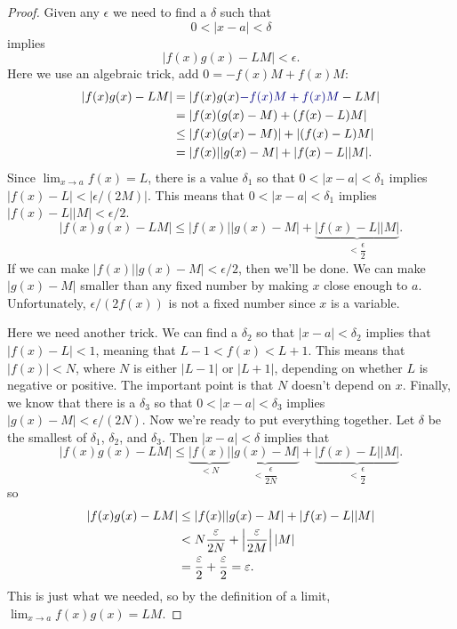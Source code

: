 \begin{proof} 
Given any $\epsilon$ we need to find a $\delta$ such that
\[
0<|x - a|< \delta
\]
implies 
\[
|f(x)g(x)-LM|< \epsilon.  
\]
Here we use an algebraic trick, add $0 = -f(x)M+f(x)M$:
\begin{align*}
|f(x)g(x)-LM| &= |f(x)g(x){\color{penColor2}-f(x)M+f(x)M}-LM| \\
&=|f(x)(g(x)-M)+(f(x)-L)M| \\
&\le |f(x)(g(x)-M)|+|(f(x)-L)M| \\
&=|f(x)||g(x)-M|+|f(x)-L||M|.
\end{align*}
Since $\lim_{x\to a}f(x) =L$, there is a value $\delta_1$ so that
$0<|x-a|<\delta_1$ implies $|f(x)-L|<|\epsilon/(2M)|$. This means that
$0<|x-a|<\delta_1$ implies $|f(x)-L||M|< \epsilon/2$. 
\[
|f(x)g(x)-LM|\le|f(x)||g(x)-M|+\underbrace{|f(x)-L||M|}_{<\dfrac{\epsilon}{2}}.
\]
If we can make $|f(x)||g(x)-M|<\epsilon/2$, then we'll be done. We can
make $|g(x)-M|$ smaller than any fixed number by making $x$ close
enough to $a$. Unfortunately, $\epsilon/(2f(x))$ is not a fixed number
since $x$ is a variable.

Here we need another trick. We can find a $\delta_2$ so that
$|x-a|<\delta_2$ implies that $|f(x)-L|<1$, meaning that $L-1 < f(x) <
L+1$. This means that $|f(x)|<N$, where $N$ is either $|L-1|$ or
$|L+1|$, depending on whether $L$ is negative or positive. The
important point is that $N$ doesn't depend on $x$. Finally, we know
that there is a $\delta_3$ so that $0<|x-a|<\delta_3$ implies
$|g(x)-M|<\epsilon/(2N)$. Now we're ready to put everything
together. Let $\delta$ be the smallest of $\delta_1$, $\delta_2$, and
$\delta_3$. Then $|x-a|<\delta$ implies that
\[
|f(x)g(x)-LM|\le\underbrace{|f(x)|}_{<N}\underbrace{|g(x)-M|}_{<\dfrac{\epsilon}{2N}}+\underbrace{|f(x)-L||M|}_{<\dfrac{\epsilon}{2}}.
\]
so
\begin{align*}
|f(x)g(x)-LM|&\le|f(x)||g(x)-M|+|f(x)-L||M| \\
&<N{\epsilon\over 2N}+\left|{\epsilon\over 2M}\right||M| \\
&={\epsilon\over 2}+{\epsilon\over 2}=\epsilon.
\end{align*}
This is just what we needed, so by the definition of a limit,
$\lim_{x\to a}f(x)g(x)=LM$.
\end{proof}



